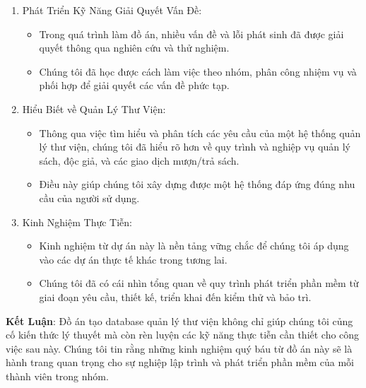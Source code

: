 \documentclass[12pt]{article}
\begin{document}
\begin{enumerate}
\item Phát Triển Kỹ Năng Giải Quyết Vấn Đề:
 \begin{itemize}
        \item Trong quá trình làm đồ án, nhiều vấn đề và lỗi phát sinh đã được giải quyết thông qua nghiên cứu và thử nghiệm.
        \item Chúng tôi đã học được cách làm việc theo nhóm, phân công nhiệm vụ và phối hợp để giải quyết các vấn đề phức tạp.
    \end{itemize}
\item Hiểu Biết về Quản Lý Thư Viện:
 \begin{itemize}
        \item Thông qua việc tìm hiểu và phân tích các yêu cầu của một hệ thống quản lý thư viện, chúng tôi đã hiểu rõ hơn về quy trình và nghiệp vụ quản lý sách, độc giả, và các giao dịch mượn/trả sách.
        \item Điều này giúp chúng tôi xây dựng được một hệ thống đáp ứng đúng nhu cầu của người sử dụng.
    \end{itemize}
\item Kinh Nghiệm Thực Tiễn:
\begin{itemize}
    \item Kinh nghiệm từ dự án này là nền tảng vững chắc để chúng tôi áp dụng vào các dự án thực tế khác trong tương lai.
 \item Chúng tôi đã có cái nhìn tổng quan về quy trình phát triển phần mềm từ giai đoạn yêu cầu, thiết kế, triển khai đến kiểm thử và bảo trì.
\end{itemize}
\end{enumerate}
\textbf{Kết Luận}:
Đồ án tạo database quản lý thư viện không chỉ giúp chúng tôi củng cố kiến thức lý thuyết mà còn rèn luyện các kỹ năng thực tiễn cần thiết cho công việc sau này. Chúng tôi tin rằng những kinh nghiệm quý báu từ đồ án này sẽ là hành trang quan trọng cho sự nghiệp lập trình và phát triển phần mềm của mỗi thành viên trong nhóm.
\end{document}
